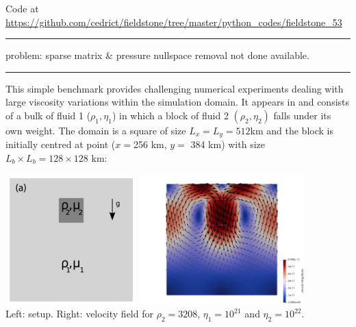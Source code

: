 

\begin{center}
Code at \url{https://github.com/cedrict/fieldstone/tree/master/python_codes/fieldstone_53}
\end{center}

\par\noindent\rule{\textwidth}{0.4pt}

problem: sparse matrix \& pressure nullspace removal not done available.


\par\noindent\rule{\textwidth}{0.4pt}


This simple benchmark provides challenging numerical experiments 
dealing with large viscosity variations within the simulation
domain. It appears in \cite{gery10} and consists of a bulk of fluid 1 ($\rho_1,\eta_1$)
in which a block of fluid 2 $(\rho_2,\eta_2)$ falls under its own
weight. The domain is a square of size $L_x=L_y=512$km and the
block is initially centred at point ($x=$256 km, $y=$ 384 km) with size
$L_b\times L_b = 128\times 128$ km:

\begin{center}
\includegraphics[height=5cm]{python_codes/fieldstone_53/images/setup}
\includegraphics[height=5cm]{python_codes/fieldstone_53/images/vel}\\
{\captionfont Left: setup. Right: velocity field for $\rho_2=3208$, $\eta_1=10^{21}$
and $\eta_2=10^{22}$.}
\end{center}


